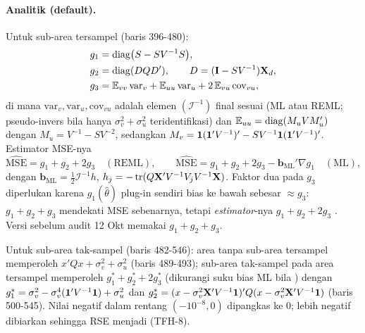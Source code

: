 \paragraph{Analitik (default).} Untuk sub-area tersampel (baris 396-480):
\begin{align}
  g_1&=\operatorname{diag}\bigl(S-SV^{-1}S\bigr),
    \label{eq:tf-g1}\\
  g_2&=\operatorname{diag}(DQD'),\qquad D=(\mathbf{I}-SV^{-1})\mathbf{X}_d,
    \label{eq:tf-g2}\\
  g_3&=\mathbb E_{vv}\,\mathrm{var}_v+\mathbb E_{uu}\,\mathrm{var}_u
      +2\,\mathbb E_{vu}\,\mathrm{cov}_{vu},
    \label{eq:tf-g3}
\end{align}
di mana $\mathrm{var}_v,\mathrm{var}_u,\mathrm{cov}_{vu}$ adalah elemen
$(\mathcal I^{-1})$ final sesuai  (ML atau REML; pseudo-invers
bila hanya $\sigma_v^2+\sigma_u^2$ teridentifikasi) dan
$\mathbb E_{uu}=\operatorname{diag}(M_uVM_u')$ dengan $M_u=V^{-1}-SV^{-2}$, sedangkan
$M_v=\mathbf{1}(\mathbf{1}'V^{-1})'-SV^{-1}\mathbf{1}(\mathbf{1}'V^{-1})'$. Estimator MSE-nya
\begin{equation}
  \widehat{\mathrm{MSE}}=g_1+g_2+2g_3\quad(\text{REML}),\qquad
  \widehat{\mathrm{MSE}}=g_1+g_2+2g_3-\mathbf b_{\text{ML}}'\nabla g_1
  \quad(\text{ML}),
  \label{eq:tf-mse}
\end{equation}
dengan $\mathbf b_{\text{ML}}=\tfrac12\mathcal I^{-1}h$,
$h_j=-\operatorname{tr}(Q\mathbf{X}'V^{-1}V_jV^{-1}\mathbf{X})$. Faktor dua pada $g_3$ diperlukan
karena $g_1(\hat\theta)$ plug-in sendiri bias ke bawah sebesar $\approx g_3$:
$g_1+g_2+g_3$ mendekati MSE sebenarnya, tetapi \emph{estimator}-nya
$g_1+g_2+2g_3$ \citep{prasad1990estimation, datta2000unified}. Versi
sebelum audit 12 Okt memakai $g_1+g_2+g_3$.


Untuk sub-area tak-sampel (baris 482-546): area tanpa sub-area tersampel
memperoleh $x'Qx+\sigma_v^2+\sigma_u^2$ (baris 489-493); sub-area tak-sampel
pada area tersampel memperoleh $g_1^\ast+g_2^\ast+2g_3^\ast$ (dikurangi suku
bias ML bila ) dengan
$g_1^\ast=\sigma_v^2-\sigma_v^4(\mathbf{1}'V^{-1}\mathbf{1})+\sigma_u^2$ dan
$g_2^\ast=(x-\sigma_v^2\mathbf{X}'V^{-1}\mathbf{1})'Q(x-\sigma_v^2\mathbf{X}'V^{-1}\mathbf{1})$
(baris 500-545). Nilai negatif dalam rentang $(-10^{-8},0)$ dipangkas ke $0$;
lebih negatif dibiarkan sehingga RSE menjadi  (TFH-8).

